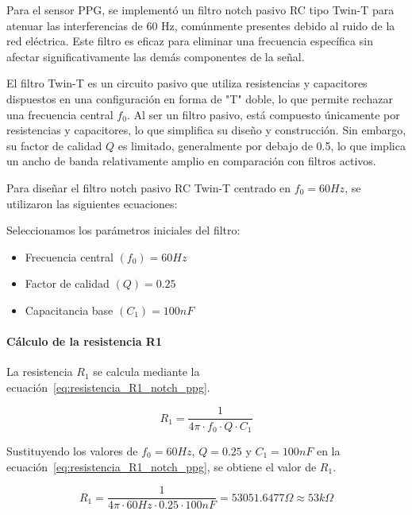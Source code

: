         Para el sensor PPG, se implementó un filtro notch pasivo RC tipo Twin-T para atenuar las interferencias de 60 Hz, comúnmente presentes debido al ruido de la red eléctrica. Este filtro es eficaz para eliminar una frecuencia específica sin afectar significativamente las demás componentes de la señal.

        El filtro Twin-T es un circuito pasivo que utiliza resistencias y capacitores dispuestos en una configuración en forma de "T" doble, lo que permite rechazar una frecuencia central $f_0$. Al ser un filtro pasivo, está compuesto únicamente por resistencias y capacitores, lo que simplifica su diseño y construcción. Sin embargo, su factor de calidad $Q$ es limitado, generalmente por debajo de 0.5, lo que implica un ancho de banda relativamente amplio en comparación con filtros activos.

        Para diseñar el filtro notch pasivo RC Twin-T centrado en $f_0 = 60 Hz$, se utilizaron las siguientes ecuaciones:

        Seleccionamos los parámetros iniciales del filtro:
        \begin{itemize}
            \item Frecuencia central $(f_0) = 60 Hz$
            \item Factor de calidad $(Q) = 0.25$
            \item Capacitancia base $(C_1) = 100 nF$
        \end{itemize}

        \paragraph{Cálculo de la resistencia R1}
        La resistencia $R_1$ se calcula mediante la ecuación~\ref{eq:resistencia_R1_notch_ppg}.

        \begin{equation}
            \label{eq:resistencia_R1_notch_ppg}
            R_1 = \frac{1}{4\pi \cdot f_0 \cdot Q \cdot C_1}
        \end{equation}

        Sustituyendo los valores de $f_0 = 60 Hz$, $Q = 0.25$ y $C_1 = 100 nF$ en la ecuación~\ref{eq:resistencia_R1_notch_ppg}, se obtiene el valor de $R_1$.

        \begin{equation}
            R_1 = \frac{1}{4\pi \cdot 60 Hz \cdot 0.25 \cdot 100 nF} = 53051.6477 \Omega \approx 53 k\Omega
        \end{equation}

